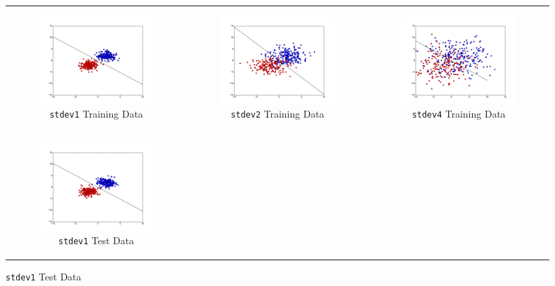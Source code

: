 \documentclass{sigchi}
\begin{document}
\begin{figure}[!ht]
\centering
\begin{tabular}{c c c}
\begin{subfigure}[b]{2.25in}
	\includegraphics[width = 2.25in]{plots/stdev1_train_plot.png}
	\caption{\texttt{stdev1} Training Data}
\end{subfigure} &

\begin{subfigure}[b]{2.25in}
	\includegraphics[width = 2.25in]{plots/stdev2_train_plot.png}
	\caption{\texttt{stdev2} Training Data}
\end{subfigure} &

\begin{subfigure}[b]{2.25in}
	\includegraphics[width = 2.25in]{plots/stdev4_train_plot.png}
	\caption{\texttt{stdev4} Training Data}
\end{subfigure} \\

\begin{subfigure}[b]{2.25in}
	\includegraphics[width = 2.25in]{plots/stdev1_test_plot.png}
	\caption{\texttt{stdev1} Test Data}
\end{subfigure} &


\end{tabular}
\end{figure}
\end{document}
